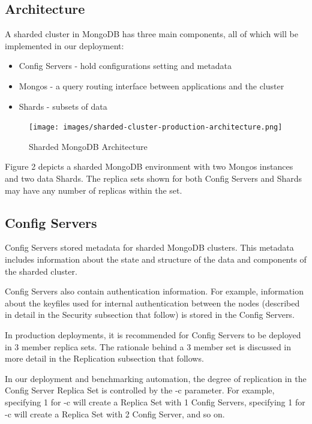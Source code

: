 \documentclass[9pt,twocolumn,twoside]{styles/osajnl}
\begin{document}
\subsection{Architecture}

A sharded cluster in MongoDB has three main components, all of which will be implemented in our deployment:

\vspace{-\topsep}
\begin{itemize}
\item Config Servers - hold configurations setting and metadata
\item Mongos - a query routing interface between applications and the cluster
\item Shards - subsets of data
\end{itemize}
\vspace{-\topsep}

\begin{figure}[ht]
  \texttt{[image: images/sharded-cluster-production-architecture.png]}
  \caption{Sharded MongoDB Architecture} \cite{www-mongoComponents}
\end{figure}

Figure 2 depicts a sharded MongoDB environment with two Mongos instances and two data Shards.  The replica sets shown for both Config Servers and Shards may have any number of replicas within the set.

\subsection{Config Servers}

Config Servers stored metadata for sharded MongoDB clusters.  This metadata includes information about the state and structure of the data and components of the sharded cluster. \cite{www-mongoConfig}

Config Servers also contain authentication information.  For example, information about the keyfiles used for internal authentication between the nodes (described in detail in the Security subsection that follow) is stored in the Config Servers. \cite{www-mongoConfig}

In production deployments, it is recommended for Config Servers to be deployed in 3 member replica sets. \cite{www-mongoComponents}  The rationale behind a 3 member set is discussed in more detail in the Replication subsection that follows.

In our deployment and benchmarking automation, the degree of replication in the Config Server Replica Set is controlled by the -c parameter.  For example, specifying 1 for -c will create a Replica Set with 1 Config Servers, specifying 1 for -c will create a Replica Set with 2 Config Server, and so on. 
\end{document}

